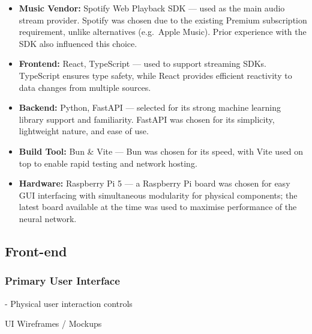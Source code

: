                 \begin{itemize}
                    \item \textbf{Music Vendor:} Spotify Web Playback SDK --- used as the main audio stream provider. Spotify was chosen due to the existing Premium subscription requirement, unlike alternatives (e.g.\ Apple Music). Prior experience with the SDK also influenced this choice.
    
                    \item \textbf{Frontend:} React, TypeScript --- used to support streaming SDKs. TypeScript ensures type safety, while React provides efficient reactivity to data changes from multiple sources.
                    
                    \item \textbf{Backend:} Python, FastAPI --- selected for its strong machine learning library support and familiarity. FastAPI was chosen for its simplicity, lightweight nature, and ease of use.
                    
                    \item \textbf{Build Tool:} Bun \& Vite --- Bun was chosen for its speed, with Vite used on top to enable rapid testing and network hosting.
    
                    \item \textbf{Hardware:} Raspberry Pi 5 --- a Raspberry Pi board was chosen for easy GUI interfacing with simultaneous modularity for physical components; the latest board available at the time was used to maximise performance of the neural network.
                \end{itemize}
        
        \subsection{Front-end}
            \subsubsection{Primary User Interface}
    
                \begin{temp}
                    - Physical user interaction controls
                \end{temp}
    
                \begin{temp}
                    UI Wireframes / Mockups
                \end{temp}
    
